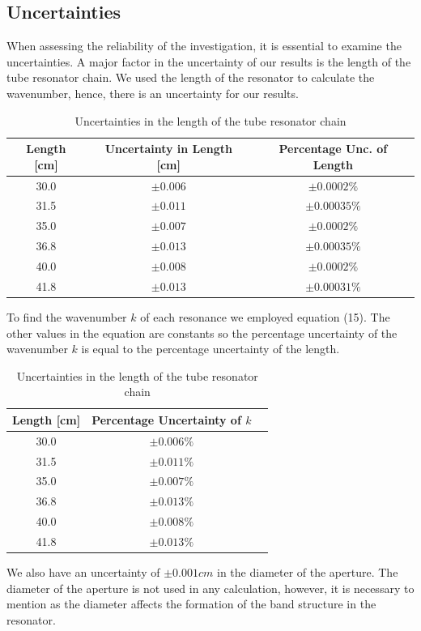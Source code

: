 \documentclass[12pt]{article}
\begin{document}
\subsection{Uncertainties}
When assessing the reliability of the investigation, it is essential to examine the uncertainties. A major factor in the uncertainty of our results is the length of the tube resonator chain. We used the length of the resonator to calculate the wavenumber, hence, there is an uncertainty for our results. 

\begin{table}[hbt]
 \begin{center}
   \caption{Uncertainties in the length of the tube resonator chain}
    \label{tab:table4}
    \begin{tabular}{c c c} 
      \hline 
     \textbf{Length [cm]} & \textbf{Uncertainty in Length [cm]} & \textbf{Percentage Unc. of Length}\\
      \hline
      30.0 & $\pm 0.006$ & $\pm 0.0002\%$\\
      31.5 & $\pm 0.011$ & $\pm 0.00035\%$\\
      35.0 & $\pm 0.007$ & $\pm 0.0002\%$\\
      36.8 & $\pm 0.013$ & $\pm 0.00035\%$\\
      40.0 & $\pm 0.008$ & $\pm 0.0002\%$\\
      41.8 & $\pm 0.013$ & $\pm 0.00031\%$\\       
      \hline
    \end{tabular}
  \end{center}
\end{table}
To find the wavenumber $k$ of each resonance we employed equation (15). The other values in the equation are constants so the percentage uncertainty of the wavenumber $k$ is equal to the percentage uncertainty of the length. 
\begin{table}[hbt]
 \begin{center}
   \caption{Uncertainties in the length of the tube resonator chain}
    \label{tab:table4}
    \begin{tabular}{c c c} 
      \hline 
     \textbf{Length [cm]} & \textbf{Percentage Uncertainty of $k$} \\
      \hline
      30.0 & $\pm 0.006\%$\\
      31.5 & $\pm 0.011\%$\\
      35.0 & $\pm 0.007\%$\\
      36.8 & $\pm 0.013\%$\\
      40.0 & $\pm 0.008\%$\\
      41.8 & $\pm 0.013\%$\\       
      \hline
    \end{tabular}
  \end{center}
\end{table}
We also have an uncertainty of $\pm 0.001 cm$ in the diameter of the aperture. The diameter of the aperture is not used in any calculation, however, it is necessary to mention as the diameter affects the formation of the band structure in the resonator. 
\end{document}
